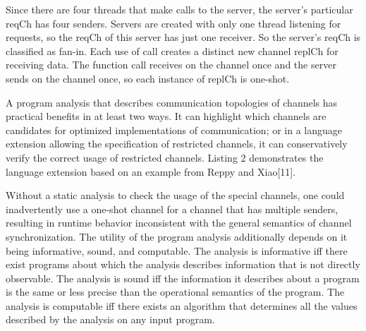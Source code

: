 \documentclass{article}
\begin{document}
Since there are four threads that make calls to the server, the server's particular reqCh has four senders.  Servers are created with only one thread listening for requests, so the reqCh of this server has just one receiver.  So the server's reqCh is classified as fan-in.  Each use of call creates a distinct new channel replCh for receiving data.  The function call receives on the channel once and the server sends on the channel once, so each instance of replCh is one-shot.

	A program analysis that describes communication topologies of channels has practical benefits in at least two ways.  It can highlight which channels are candidates for optimized implementations of communication; or in a language extension allowing the specification of restricted channels, it can conservatively verify the correct usage of restricted channels.  Listing 2 demonstrates the language extension based on an example from Reppy and Xiao[11].


  Without a static analysis to check the usage of the special channels, one could inadvertently use a one-shot channel for a channel that has multiple senders, resulting in runtime behavior inconsistent with the general semantics of channel synchronization.
	The utility of the program analysis additionally depends on it being informative, sound, and computable.  The analysis is informative iff there exist programs about which the analysis describes information that is not directly observable.  The analysis is sound iff the information it describes about a program is the same or less precise than the operational semantics of the program. The analysis is computable iff there exists an algorithm that determines all the values described by the analysis on any input program.
\end{document}
